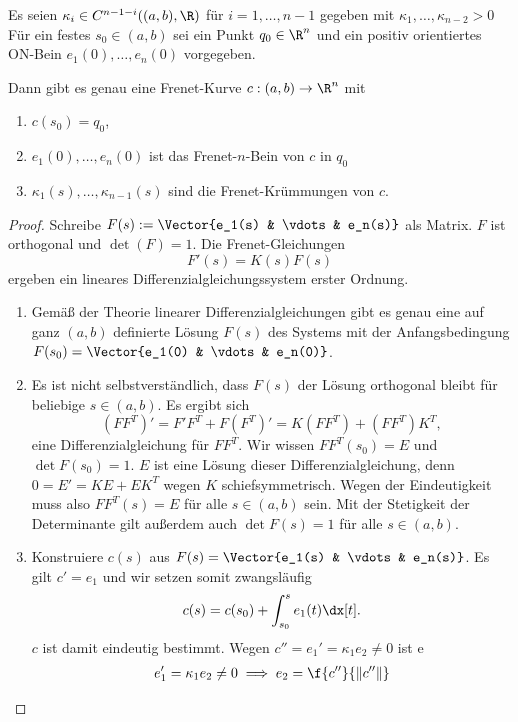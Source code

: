 \begin{st}
	Es seien $\kappa_i \in C^{n-1-i}((a,b), \R)$ für $i = 1, \dotsc, n-1$ gegeben mit $\kappa_1, \dotsc, \kappa_{n-2} > 0$
	Für ein festes $s_0 \in (a,b)$ sei ein Punkt $q_0 \in \R^n$ und ein positiv orientiertes ON-Bein $e_1(0), \dotsc, e_n(0)$ vorgegeben.

	Dann gibt es genau eine Frenet-Kurve $c: (a,b) \to \R^n$ mit
	\begin{enumerate}[1)]
		\item
			$c(s_0) = q_0$,
		\item
			$e_1(0), \dotsc, e_n(0)$ ist das Frenet-$n$-Bein von $c$ in $q_0$
		\item
			$\kappa_1(s), \dotsc, \kappa_{n-1}(s)$ sind die Frenet-Krümmungen von $c$.
	\end{enumerate}
	\begin{proof}
		Schreibe $F(s) := \Vector{e_1(s) & \vdots & e_n(s)}$ als Matrix.
		$F$ ist orthogonal und $\det(F) = 1$.
		Die Frenet-Gleichungen
		\[
			F'(s) = K(s) F(s)
		\]
		ergeben ein lineares Differenzialgleichungssystem erster Ordnung.
		\begin{enumerate}[1.]
			\item
				Gemäß der Theorie linearer Differenzialgleichungen gibt es genau eine auf ganz $(a,b)$ definierte Lösung $F(s)$ des Systems mit der Anfangsbedingung $F(s_0) = \Vector{e_1(0) & \vdots & e_n(0)}$.
			\item
				Es ist nicht selbstverständlich, dass $F(s)$ der Lösung orthogonal bleibt für beliebige $s \in (a,b)$.
				Es ergibt sich
				\[
					(FF^T)'
					= F' F^T + F (F^T)'
					= K (F F^T) + (F F^T) K^T,
				\]
				eine Differenzialgleichung für $FF^T$.
				Wir wissen $FF^T(s_0) = E$ und $\det F(s_0) = 1$.
				$E$ ist eine Lösung dieser Differenzialgleichung, denn $0 = E' = KE + EK^T$ wegen $K$ schiefsymmetrisch.
				Wegen der Eindeutigkeit muss also $FF^T(s) = E$ für alle $s \in (a,b)$ sein.
				Mit der Stetigkeit der Determinante gilt außerdem auch $\det F(s) = 1$ für alle $s \in (a,b)$.
			\item
				Konstruiere $c(s)$ aus $F(s) = \Vector{e_1(s) & \vdots & e_n(s)}$.
				Es gilt $c' = e_1$ und wir setzen somit zwangsläufig
				\[
					c(s) = c(s_0) + \int_{s_0}^s e_1(t) \dx[t].
				\]
				$c$ ist damit eindeutig bestimmt.
				Wegen $c'' = e_1' = \kappa_1 e_2 \neq 0$ ist e
				\begin{align*}
					e_1' = \kappa_1 e_2 \neq 0 &\implies e_2 = \f{c''}{\|c''\|} \\

\end{align*}
\end{enumerate}
\end{proof}
\end{st}
